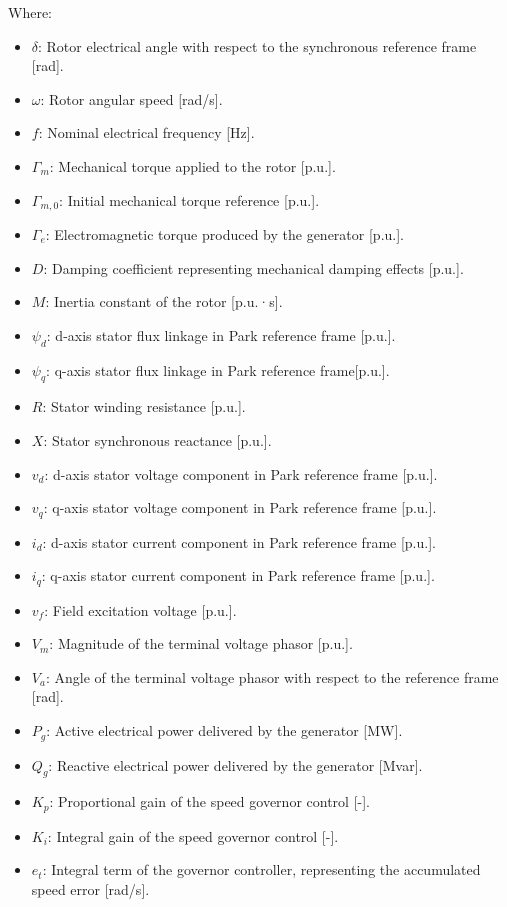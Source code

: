 Where:
\begin{itemize}
  \item $\delta$: Rotor electrical angle with respect to the synchronous reference frame [rad].
  \item $\omega$: Rotor angular speed [rad/s].
  \item $f$: Nominal electrical frequency [Hz].
  \item $\Gamma_m$: Mechanical torque applied to the rotor [p.u.].
  \item $\Gamma_{m,0}$: Initial mechanical torque reference [p.u.].
  \item $\Gamma_e$: Electromagnetic torque produced by the generator [p.u.].
  \item $D$: Damping coefficient representing mechanical damping effects [p.u.].
  \item $M$: Inertia constant of the rotor [p.u.·s].
  \item $\psi_d$: d-axis stator flux linkage in Park reference frame [p.u.].
  \item $\psi_q$: q-axis stator flux linkage in Park reference frame[p.u.].
  \item $R$: Stator winding resistance [p.u.].
  \item $X$: Stator synchronous reactance [p.u.].
  \item $v_d$: d-axis stator voltage component in Park reference frame [p.u.].
  \item $v_q$: q-axis stator voltage component in Park reference frame [p.u.].
  \item $i_d$: d-axis stator current component in Park reference frame [p.u.].
  \item $i_q$: q-axis stator current component in Park reference frame [p.u.].
  \item $v_f$: Field excitation voltage [p.u.].
  \item $V_m$: Magnitude of the terminal voltage phasor [p.u.].
  \item $V_a$: Angle of the terminal voltage phasor with respect to the reference frame [rad].
  \item $P_g$: Active electrical power delivered by the generator [MW].
  \item $Q_g$: Reactive electrical power delivered by the generator [Mvar].
  \item $K_p$: Proportional gain of the speed governor control [-].
  \item $K_i$: Integral gain of the speed governor control [-].
  \item $e_t$: Integral term of the governor controller, representing the accumulated speed error [rad/s].
\end{itemize}

